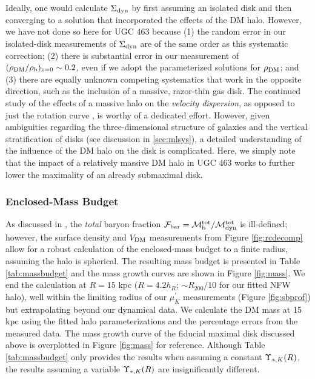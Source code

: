 \documentclass[apj,iop,numberedappendix]{emulateapj}
\begin{document}
Ideally, one would calculate $\Sigma_{\rm dyn}$ by first assuming an isolated disk and
then converging to a solution that incorporated the effects of the DM halo.
However, we have not done so here for UGC 463 because (1) the random error in
our isolated-disk measurements of $\Sigma_{\rm dyn}$ are of the same order as this
systematic correction; (2) there is substantial error in our measurement of
$(\rho_{\rm DM}/\rho_{\rm b})_{z=0} \sim 0.2$, even if we adopt the parameterized solutions
for $\rho_{\rm DM}$; and (3) there are equally unknown competing systematics that work
in the opposite direction, such as the inclusion of a massive, razor-thin gas
disk.  The continued study of the effects of a massive halo on the {\it velocity
dispersion}, as opposed to just the rotation curve \citep{2006MNRAS.373.1117H,
2008ApJ...679.1232W}, is worthy of a dedicated effort.  However, given
ambiguities regarding the three-dimensional structure of galaxies and the
vertical stratification of disks (see discussion in \sect \ref{sec:mlsys}), a
detailed understanding of the influence of the DM halo on the disk is
complicated.  Here, we simply note that the impact of a relatively massive DM
halo in UGC 463 works to further lower the maximality of an already submaximal
disk.

\subsubsection{Enclosed-Mass Budget}
\label{sec:massbudget}

As discussed in , the {\it total} baryon
fraction ${\mathcal F}_{\rm bar} = \mathcal{M}^{\rm tot}_{\rm b}/\mathcal{M}^{\rm tot}_{\rm dyn}$ is ill-defined; however, the
surface density and $V_{\rm DM}$ measurements from Figure \ref{fig:rcdecomp} allow for
a robust calculation of the enclosed-mass budget to a finite radius, assuming
the halo is spherical.  The resulting mass budget is presented in Table
\ref{tab:massbudget} and the mass growth curves are shown in Figure
\ref{fig:mass}.  We end the calculation at $R=15$ kpc ($R=4.2h_R$; $\sim
R_{200}/10$ for our fitted NFW halo), well within the limiting radius of our
$\mu^{\prime}_K$ measurements (Figure \ref{fig:sbprof}) but extrapolating beyond
our dynamical data.  We calculate the DM mass at 15 kpc using the fitted halo
parameterizations and the percentage errors from the measured data.  The mass
growth curve of the fiducial maximal disk discussed above is overplotted in
Figure \ref{fig:mass} for reference.  Although Table \ref{tab:massbudget} only
provides the results when assuming a constant $\Upsilon_{\ast,K}(R)$, the results assuming a
variable $\Upsilon_{\ast,K}(R)$ are insignificantly different.
\end{document}
